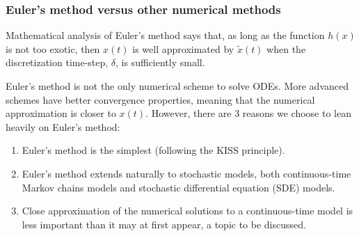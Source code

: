 \documentclass{beamer}\usepackage[]{graphicx}\usepackage[]{color}
\begin{document}
\begin{frame}[fragile]

\frametitle{Euler's method versus other numerical methods}
\bi
\item Mathematical analysis of Euler's method says that, as long as the function $h(x)$ is not too exotic, then $x(t)$ is well approximated by $\tilde x(t)$  when the discretization time-step, $\delta$, is sufficiently small.

\item Euler's method is not the only numerical scheme to solve ODEs. More advanced schemes have better convergence properties, meaning that the numerical approximation is closer to $x(t)$. However, there are 3 reasons we choose to lean heavily on Euler's method:

\begin{enumerate}
\item Euler's method is the simplest (following the KISS principle).

\item Euler's method extends naturally to stochastic models, both continuous-time Markov chains models and stochastic differential equation (SDE) models.

\item Close approximation of the numerical solutions to a continuous-time model is less important than it may at first appear, a topic to be discussed.
\end{enumerate}
\ei

\end{frame}
\end{document}
